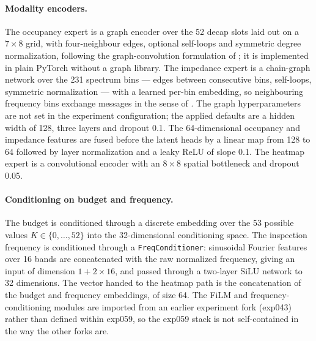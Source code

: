 \paragraph{Modality encoders.} The occupancy expert is a graph encoder over the 52 decap slots laid
out on a $7 \times 8$ grid, with four-neighbour edges, optional self-loops and symmetric degree
normalization, following the graph-convolution formulation of \cite{kipf2016graph}; it is implemented
in plain PyTorch without a graph library. The impedance expert is a chain-graph network over the 231
spectrum bins --- edges between consecutive bins, self-loops, symmetric normalization --- with a
learned per-bin embedding, so neighbouring frequency bins exchange messages in the sense of
\cite{gilmer2017message}. The graph hyperparameters are not set in the experiment configuration; the
applied defaults are a hidden width of 128, three layers and dropout 0.1. The 64-dimensional
occupancy and impedance features are fused before the latent heads by a linear map from 128 to 64
followed by layer normalization and a leaky ReLU of slope 0.1. The heatmap expert is a convolutional
encoder with an $8 \times 8$ spatial bottleneck and dropout 0.05.

\paragraph{Conditioning on budget and frequency.} The budget is conditioned through a discrete
embedding over the 53 possible values $K \in \{0,\dots,52\}$ into the 32-dimensional conditioning
space. The inspection frequency is conditioned through a \texttt{FreqConditioner}: sinusoidal Fourier
features over 16 bands are concatenated with the raw normalized frequency, giving an input of
dimension $1 + 2 \times 16$, and passed through a two-layer SiLU network to 32 dimensions. The vector
handed to the heatmap path is the concatenation of the budget and frequency embeddings, of size 64.
The FiLM and frequency-conditioning modules are imported from an earlier experiment fork (exp043)
rather than defined within exp059, so the exp059 stack is not self-contained in the way the other
forks are.

